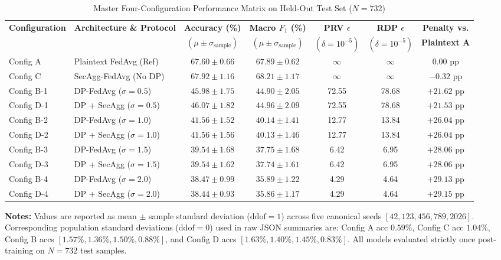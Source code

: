 \documentclass[journal,twocolumn,10pt]{IEEEtran}
\begin{document}
\begin{table}[t]
\caption{Master Four-Configuration Performance Matrix on Held-Out Test Set ($N = 732$)}
\label{tab:master_results}
\centering
\scriptsize
\begin{tabular}{llccccc}
\toprule
\textbf{Configuration} & \textbf{Architecture \& Protocol} & \textbf{Accuracy (\%)} & \textbf{Macro $F_1$ (\%)} & \textbf{PRV $\epsilon$} & \textbf{RDP $\epsilon$} & \textbf{Penalty vs.} \\
& & $(\mu \pm \sigma_{\text{sample}})$ & $(\mu \pm \sigma_{\text{sample}})$ & $(\delta = 10^{-5})$ & $(\delta = 10^{-5})$ & \textbf{Plaintext A} \\
\midrule
Config A & Plaintext FedAvg (Ref) & $67.60 \pm 0.66$ & $67.89 \pm 0.62$ & $\infty$ & $\infty$ & 0.00 pp \\
Config C & SecAgg-FedAvg (No DP) & $67.92 \pm 1.16$ & $68.21 \pm 1.17$ & $\infty$ & $\infty$ & $-0.32$ pp \\
Config B-1 & DP-FedAvg ($\sigma = 0.5$) & $45.98 \pm 1.75$ & $44.90 \pm 2.05$ & 72.55 & 78.68 & $+21.62$ pp \\
Config D-1 & DP + SecAgg ($\sigma = 0.5$) & $46.07 \pm 1.82$ & $44.96 \pm 2.09$ & 72.55 & 78.68 & $+21.53$ pp \\
Config B-2 & DP-FedAvg ($\sigma = 1.0$) & $41.56 \pm 1.52$ & $40.14 \pm 1.41$ & 12.77 & 13.84 & $+26.04$ pp \\
Config D-2 & DP + SecAgg ($\sigma = 1.0$) & $41.56 \pm 1.56$ & $40.13 \pm 1.46$ & 12.77 & 13.84 & $+26.04$ pp \\
Config B-3 & DP-FedAvg ($\sigma = 1.5$) & $39.54 \pm 1.68$ & $37.75 \pm 1.68$ & 6.42 & 6.95 & $+28.06$ pp \\
Config D-3 & DP + SecAgg ($\sigma = 1.5$) & $39.54 \pm 1.62$ & $37.74 \pm 1.61$ & 6.42 & 6.95 & $+28.06$ pp \\
Config B-4 & DP-FedAvg ($\sigma = 2.0$) & $38.47 \pm 0.99$ & $35.89 \pm 1.22$ & 4.29 & 4.64 & $+29.13$ pp \\
Config D-4 & DP + SecAgg ($\sigma = 2.0$) & $38.44 \pm 0.93$ & $35.86 \pm 1.17$ & 4.29 & 4.64 & $+29.15$ pp \\
\bottomrule
\end{tabular}
\vspace{1mm}
\begin{flushleft}
\scriptsize \textbf{Notes:} Values are reported as mean $\pm$ sample standard deviation ($\text{ddof}=1$) across five canonical seeds $[42, 123, 456, 789, 2026]$. Corresponding population standard deviations ($\text{ddof}=0$) used in raw JSON summaries are: Config A acc $0.59\%$, Config C acc $1.04\%$, Config B accs $[1.57\%, 1.36\%, 1.50\%, 0.88\%]$, and Config D accs $[1.63\%, 1.40\%, 1.45\%, 0.83\%]$. All models evaluated strictly once post-training on $N=732$ test samples.
\end{flushleft}
\end{table}
\end{document}
